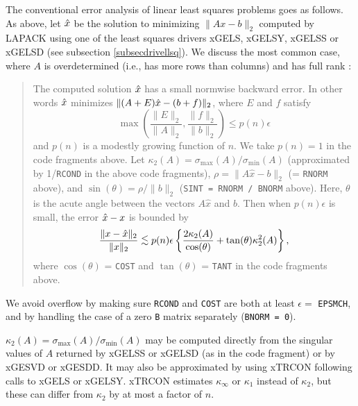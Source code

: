 The conventional error analysis of linear least squares problems goes
as follows.
As above, let $\hat{x}$ be the solution to minimizing
$\| Ax-b \|_2$ computed by
LAPACK using one of the least squares drivers
xGELS, xGELSY, xGELSS or xGELSD
(see subsection \ref{subsecdrivellsq}).
We discuss the most common case, where $A$ is
overdetermined
(i.e., has more rows than columns) and has full rank
\cite{bjorck3,demmelMA221,GVL2,higham02}:

\begin{quote}
The computed solution $\hat{x}$ has a small normwise backward error.
In other words $\hat{x}$ minimizes $\|(A+E) \hat{x} - (b+f)\|_2$, where
$E$ and $f$ satisfy
\[
\max \left( \frac{\| E \|_2}{\| A \|_2} ,
            \frac{\| f \|_2}{\| b \|_2} \right) \leq p(n) \epsilon
\]
and $p(n)$ is a modestly growing function of $n$. We take $p(n)=1$ in
the code fragments above.
Let $\kappa_2 (A) = \sigma_{\max} (A)/\sigma_{\min} (A)$ (approximated by
1/{\tt RCOND} in the above code fragments),
$\rho = \|A \hat{x} -b\|_2$ (= {\tt RNORM} above), and $\sin ( \theta ) = \rho / \|b\|_2$
({\tt SINT = RNORM / BNORM} above). Here, $\theta$ is the acute angle between
the vectors $A \hat{x}$ and $b$.
Then when $p(n) \epsilon$ is small, the error $\hat{x} - x$ is bounded by
\[
\frac{\|x-\xhat\|_2}{\|x\|_2} \leapproxeq p(n) \epsilon
\left\{ \frac{2 \kappa_2 (A)}{\cos ( \theta )} + \tan ( \theta ) \kappa_2^2 (A)
\right\},
\]
where $\cos ( \theta ) $ = {\tt COST} and $\tan ( \theta )$ = {\tt TANT} in the code fragments
above.
\end{quote}

We avoid overflow by making sure {\tt RCOND} and {\tt COST} are both at least
$\epsilon =$ {\tt EPSMCH}, and by handling the case of a zero {\tt B} matrix
separately ({\tt BNORM = 0}).

$\kappa_2 (A) = \sigma_{\max} (A) / \sigma_{\min} (A)$ may be computed directly
from the singular values of $A$ returned by xGELSS or xGELSD (as in the code fragment)
or by xGESVD or xGESDD. It may also be approximated by using xTRCON following calls to
xGELS or xGELSY.  xTRCON estimates $\kappa_{\infty}$ or $\kappa_1$ instead
of $\kappa_2$, but these can differ from $\kappa_2$ by at most a factor of $n$.

